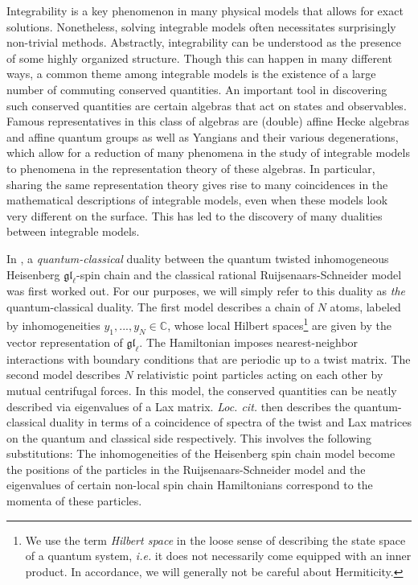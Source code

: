 \documentclass[11pt]{report}
\theoremstyle{definition}
\theoremstyle{remark}
\theoremstyle{remark}
\newcommand{\C}{\mathbb{C}}
\begin{document}
Integrability \cite{book:arutyunov:elements} is a key phenomenon in many physical models that allows for exact solutions. Nonetheless, solving integrable models often necessitates surprisingly non-trivial methods. Abstractly, integrability can be understood as the presence of some highly organized structure. Though this can happen in many different ways, a common theme among integrable models is the existence of a large number of commuting conserved quantities. An important tool in discovering such conserved quantities are certain algebras that act on states and observables. Famous representatives in this class of algebras are (double) affine Hecke algebras and affine quantum groups as well as Yangians and their various degenerations, which allow for a reduction of many phenomena in the study of integrable models to phenomena in the representation theory of these algebras. In particular, sharing the same representation theory gives rise to many coincidences in the mathematical descriptions of integrable models, even when these models look very different on the surface. This has led to the discovery of many dualities between integrable models.

In \cite{article:gorsky:2014}, a \emph{quantum-classical} duality between the quantum twisted inhomogeneous Heisenberg $\mathfrak{gl}_\ell$-spin chain and the classical rational Ruijsenaars-Schneider model was first worked out. For our purposes, we will simply refer to this duality as \emph{the} quantum-classical duality. The first model describes a chain of $N$ atoms, labeled by inhomogeneities $y_1,...,y_N \in \C$, whose local Hilbert spaces\footnote{We use the term \emph{Hilbert space} in the loose sense of describing the state space of a quantum system, \emph{i.e.} it does not necessarily come equipped with an inner product. In accordance, we will generally not be careful about Hermiticity.} are given by the vector representation of $\mathfrak{gl}_\ell$. The Hamiltonian imposes nearest-neighbor interactions with boundary conditions that are periodic up to a twist matrix. The second model describes $N$ relativistic point particles acting on each other by mutual centrifugal forces. In this model, the conserved quantities can be neatly described via eigenvalues of a Lax matrix. \emph{Loc. cit.} then describes the quantum-classical duality in terms of a coincidence of spectra of the twist and Lax matrices on the quantum and classical side respectively. This involves the following substitutions: The inhomogeneities of the Heisenberg spin chain model become the positions of the particles in the Ruijsenaars-Schneider model and the eigenvalues of certain non-local spin chain Hamiltonians correspond to the momenta of these particles.
\end{document}
